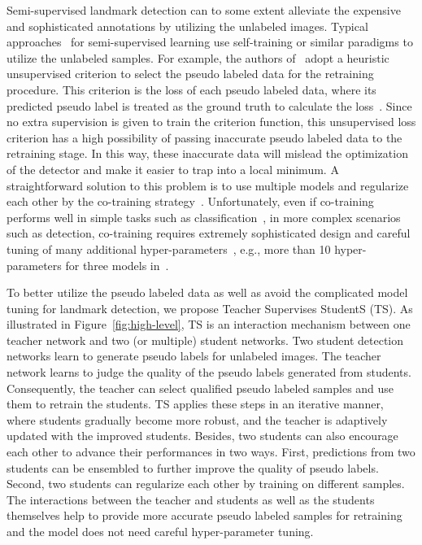 \documentclass[10pt,twocolumn,letterpaper]{article}
\def\Figref#1{Figure~\ref{#1}}
\begin{document}
Semi-supervised landmark detection can to some extent alleviate the expensive and sophisticated annotations by utilizing the unlabeled images.
Typical approaches~\cite{jiang2015self,bengio2009curriculum,kumar2010self} for semi-supervised learning use self-training or similar paradigms to utilize the unlabeled samples.
For example, the authors of~\cite{kumar2010self,jiang2015self,ma2017self} adopt a heuristic unsupervised criterion to select the pseudo labeled data for the retraining procedure. 
This criterion is the loss of each pseudo labeled data, where its predicted pseudo label is treated as the ground truth to calculate the loss~\cite{jiang2015self,ma2017self}.
Since no extra supervision is given to train the criterion function, this unsupervised loss criterion has a high possibility of passing inaccurate pseudo labeled data to the retraining stage.
In this way, these inaccurate data will mislead the optimization of the detector and make it easier to trap into a local minimum.
A straightforward solution to this problem is to use multiple models and regularize each other by the co-training strategy~\cite{blum1998combining}.
Unfortunately, even if co-training performs well in simple tasks such as classification~\cite{blum1998combining,ma2017self}, in more complex scenarios such as detection, co-training requires extremely sophisticated design and careful tuning of many additional hyper-parameters~\cite{dong2018few}, e.g., more than 10 hyper-parameters for three models in~\cite{ma2017self}.




To better utilize the pseudo labeled data as well as avoid the complicated model tuning for landmark detection, we propose Teacher Supervises StudentS (TS).
As illustrated in \Figref{fig:high-level}, TS is an interaction mechanism between one teacher network and two (or multiple) student networks.
Two student detection networks learn to generate pseudo labels for unlabeled images.
The teacher network learns to judge the quality of the pseudo labels generated from students.
Consequently, the teacher can select qualified pseudo labeled samples and use them to retrain the students.
TS applies these steps in an iterative manner, where students gradually become more robust, and the teacher is adaptively updated with the improved students.
Besides, two students can also encourage each other to advance their performances in two ways.
First, predictions from two students can be ensembled to further improve the quality of pseudo labels.
Second, two students can regularize each other by training on different samples.
The interactions between the teacher and students as well as the students themselves help to provide more accurate pseudo labeled samples for retraining and the model does not need careful hyper-parameter tuning.
\end{document}
